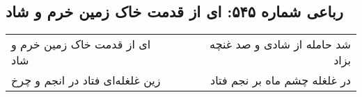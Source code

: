 \begin{center}
\section*{رباعی شماره ۵۴۵: ای از قدمت خاک زمین خرم و شاد}
\label{sec:0545}
\begin{longtable}{l p{0.5cm} r}
ای از قدمت خاک زمین خرم و شاد
&&
شد حامله از شادی و صد غنچه بزاد
\\
زین غلغله‌ای فتاد در انجم و چرخ
&&
در غلغله چشم ماه بر نجم فتاد
\\
\end{longtable}
\end{center}
